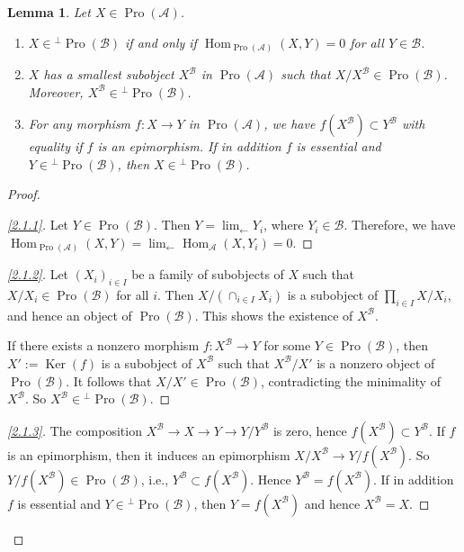 \documentclass[11pt]{article}
\newtheorem{lemm}[theo]{Lemma}
\theoremstyle{definition}
\newenvironment{proofc}{\begin{proof}}{\end{proof}}
\numberwithin{equation}{section}
\newcommand\cA{{\mathcal A}}
\newcommand\cB{{\mathcal B}}
\DeclareMathOperator{\Hom}{Hom}
\DeclareMathOperator{\Ker}{Ker}
\DeclareMathOperator{\Pro}{Pro}
\newenvironment{step}[1]{\begin{proof}[#1]}{\let\qed\relax\end{proof}}
\newenvironment{laststep}[1]{\begin{proof}[#1]}{\end{proof}}
\renewenvironment{proofc}{\begin{proof}}{\end{proof}}
\theoremstyle{remark}
\newcommand*{\romanenumi}{}%
\begin{document}
\begin{lemm}\label{lem:perp}
Let $X \in \Pro(\cA)$.
\begin{enumerate}\romanenumi
\item \label{2.1.1} $X \in {^{\perp}\Pro(\cB)}$ if and only if $\Hom_{\Pro(\cA)}(X,Y) = 0$ for all $Y \in \cB$.

\item \label{2.1.2} $X$ has a smallest subobject $X^{\cB}$ in $\Pro(\cA)$ such that $X/X^{\cB} \in \Pro(\cB)$. Moreover, $X^{\cB} \in {^{\perp}\Pro(\cB)}$.

\item \label{2.1.3} For any morphism $f : X \to Y$ in $\Pro(\cA)$, we have $f(X^{\cB}) \subset Y^{\cB}$ with equality if $f$ is an epimorphism. If in addition $f$ is essential and $Y \in {^{\perp}\Pro(\cB)}$, then $X \in {^{\perp}\Pro(\cB)}$.
\end{enumerate}
\end{lemm}

\begin{proofc}
\begin{step}{\eqref{2.1.1}}%
Let $Y \in \Pro(\cB)$. Then $Y = \lim_{\leftarrow} Y_i$, where $Y_i \in \cB$. Therefore, we have $\Hom_{\Pro(\cA)}(X,Y) = \lim_{\leftarrow} \Hom_{\cA}(X,Y_i) = 0$.
\end{step}

\begin{step}{\eqref{2.1.2}}%
Let $(X_i)_{i \in I}$ be a family of subobjects of $X$ such that $X/X_i \in \Pro(\cB)$ for all $i$. Then $X/(\cap_{i \in I} X_i)$ is a subobject of $\prod_{i \in I} X/X_i$, and hence an object of $\Pro(\cB)$. This shows the existence of $X^{\cB}$.

If there exists a nonzero morphism $f : X ^{\cB} \to Y$ for some $Y \in \Pro(\cB)$, then $X' := \Ker(f)$ is a subobject of $X^{\cB}$ such that $X^{\cB} /X'$ is a nonzero object of $\Pro(\cB)$. It follows that $X/X' \in \Pro(\cB)$, contradicting the minimality of $X^{\cB}$. So $X^{\cB} \in {^{\perp}\Pro(\cB)}$.
\end{step}

\begin{laststep}{\eqref{2.1.3}}%
The composition $X^{\cB} \to X \to Y \to Y/Y^{\cB}$ is zero, hence $f(X^{\cB}) \subset Y^{\cB}$. If $f$ is an epimorphism, then it induces an epimorphism $X/X^{\cB} \to Y/f(X^{\cB})$. So $Y/f(X^{\cB}) \in \Pro(\cB)$, i.e., $Y^{\cB} \subset f(X^{\cB})$. Hence $Y^{\cB} = f(X^{\cB})$. If in addition $f$ is essential and $Y \in {^{\perp}\Pro(\cB)}$, then $Y = f(X^{\cB})$ and hence $X^{\cB} = X$.
\end{laststep}
\let\qed\relax
\end{proofc}
\end{document}
